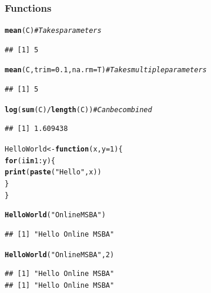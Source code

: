\documentclass{beamer}\usepackage[]{graphicx}\usepackage[]{color}
\makeatletter
\newcommand{\hlnum}[1]{\textcolor[rgb]{0.686,0.059,0.569}{#1}}%
\newcommand{\hlstr}[1]{\textcolor[rgb]{0.192,0.494,0.8}{#1}}%
\newcommand{\hlcom}[1]{\textcolor[rgb]{0.678,0.584,0.686}{\textit{#1}}}%
\newcommand{\hlopt}[1]{\textcolor[rgb]{0,0,0}{#1}}%
\newcommand{\hlstd}[1]{\textcolor[rgb]{0.345,0.345,0.345}{#1}}%
\newcommand{\hlkwa}[1]{\textcolor[rgb]{0.161,0.373,0.58}{\textbf{#1}}}%
\newcommand{\hlkwb}[1]{\textcolor[rgb]{0.69,0.353,0.396}{#1}}%
\newcommand{\hlkwc}[1]{\textcolor[rgb]{0.333,0.667,0.333}{#1}}%
\newcommand{\hlkwd}[1]{\textcolor[rgb]{0.737,0.353,0.396}{\textbf{#1}}}%
\newenvironment{kframe}{%
 \def\at@end@of@kframe{}%
 \ifinner\ifhmode%
  \def\at@end@of@kframe{\end{minipage}}%
  \begin{minipage}{\columnwidth}%
 \fi\fi%
 \def\FrameCommand##1{\hskip\@totalleftmargin \hskip-\fboxsep
 \colorbox{shadecolor}{##1}\hskip-\fboxsep
     \hskip-\linewidth \hskip-\@totalleftmargin \hskip\columnwidth}%
 \MakeFramed {\advance\hsize-\width
   \@totalleftmargin\z@ \linewidth\hsize
   \@setminipage}}%
 {\par\unskip\endMakeFramed%
 \at@end@of@kframe}
\newenvironment{knitrout}{}{} %
\makeatother
\begin{document}
\begin{frame}
\frametitle{Functions}



\begin{knitrout}\scriptsize
{}\color{fgcolor}\begin{kframe}
\begin{alltt}
\hlkwd{mean}\hlstd{(C)}  \hlcom{# Takes parameters}
\end{alltt}
\begin{verbatim}
## [1] 5
\end{verbatim}
\begin{alltt}
\hlkwd{mean}\hlstd{(C,} \hlkwc{trim} \hlstd{=} \hlnum{0.1}\hlstd{,} \hlkwc{na.rm} \hlstd{= T)}  \hlcom{# Takes multiple parameters}
\end{alltt}
\begin{verbatim}
## [1] 5
\end{verbatim}
\begin{alltt}
\hlkwd{log}\hlstd{(}\hlkwd{sum}\hlstd{(C)}\hlopt{/}\hlkwd{length}\hlstd{(C))}  \hlcom{# Can be combined}
\end{alltt}
\begin{verbatim}
## [1] 1.609438
\end{verbatim}
\end{kframe}
\end{knitrout}

\begin{knitrout}\scriptsize
{}\color{fgcolor}\begin{kframe}
\begin{alltt}
\hlstd{HelloWorld} \hlkwb{<-} \hlkwa{function}\hlstd{(}\hlkwc{x}\hlstd{,} \hlkwc{y} \hlstd{=} \hlnum{1}\hlstd{) \{}
    \hlkwa{for} \hlstd{(i} \hlkwa{in} \hlnum{1}\hlopt{:}\hlstd{y) \{}
        \hlkwd{print}\hlstd{(}\hlkwd{paste}\hlstd{(}\hlstr{"Hello"}\hlstd{, x))}
    \hlstd{\}}
\hlstd{\}}

\hlkwd{HelloWorld}\hlstd{(}\hlstr{"Online MSBA"}\hlstd{)}
\end{alltt}
\begin{verbatim}
## [1] "Hello Online MSBA"
\end{verbatim}
\begin{alltt}
\hlkwd{HelloWorld}\hlstd{(}\hlstr{"Online MSBA"}\hlstd{,} \hlnum{2}\hlstd{)}
\end{alltt}
\begin{verbatim}
## [1] "Hello Online MSBA"
## [1] "Hello Online MSBA"
\end{verbatim}
\end{kframe}
\end{knitrout}


\end{frame}
\end{document}
